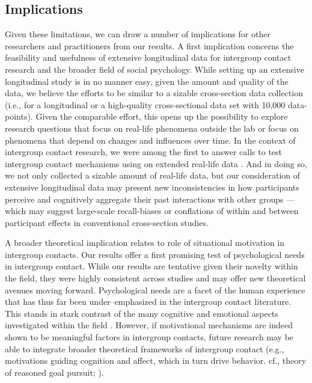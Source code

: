 \documentclass[man, 12pt, a4paper]{apa7}
\theoremstyle{break}
\theoremstyle{plain}
\begin{document}
\subsection{Implications}
Given these limitations, we can draw a number of implications for other researchers and practitioners from our results. A first implication concerns the feasibility and usefulness of extensive longitudinal data for intergroup contact research and the broader field of social psychology. While setting up an extensive longitudinal study is in no manner easy, given the amount and quality of the data, we believe the efforts to be similar to a sizable cross-section data collection (i.e., for a longitudinal or a high-quality cross-sectional data set with 10,000 data-points). Given the comparable effort, this opens up the possibility to explore research questions that focus on real-life phenomena outside the lab or focus on phenomena that depend on changes and influences over time. In the context of intergroup contact research, we were among the first to answer calls to test intergroup contact mechanisms using on extended real-life data \citep[e.g.,][]{Pettigrew2011, MacInnis2015}. And in doing so, we not only collected a sizable amount of real-life data, but our consideration of extensive longitudinal data may present new inconsistencies in how participants perceive and cognitively aggregate their past interactions with other groups — which may suggest large-scale recall-biases or conflations of within and between participant effects in conventional cross-section studies.

A broader theoretical implication relates to role of situational motivation in intergroup contacts. Our results offer a first promising test of psychological needs in intergroup contact. While our results are tentative given their novelty within the field, they were highly consistent across studies and may offer new theoretical avenues moving forward. Psychological needs are a facet of the human experience that has thus far been under–emphasized in the intergroup contact literature. This stands in stark contrast of the many cognitive \citep[e.g.,][]{Pettigrew1998, Brown2005} and emotional aspects investigated within the field \citep[e.g.,][]{Stephan2008, Paolini2004}. However, if motivational mechanisms are indeed shown to be meaningful factors in intergroup contacts, future research may be able to integrate broader theoretical frameworks of intergroup contact (e.g., motivations guiding cognition and affect, which in turn drive behavior. cf., theory of reasoned goal pursuit; \citealp{Ajzen2019}). 
\end{document}
